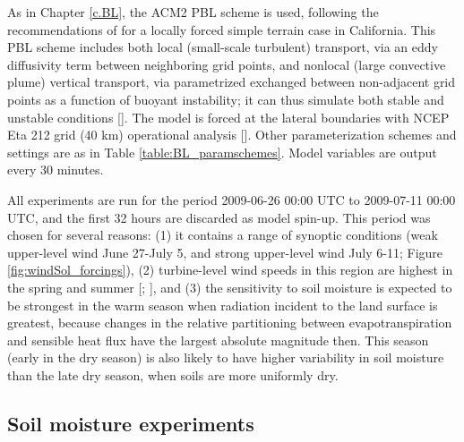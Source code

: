 As in Chapter \ref{c.BL}, the ACM2 PBL scheme is used, following the recommendations of \cite{marjanovic2014} for a locally forced simple terrain case in California.  This PBL scheme includes both local (small-scale turbulent) transport, via an eddy diffusivity term between neighboring grid points, and nonlocal (large convective plume) vertical transport, via parametrized exchanged between non-adjacent grid points as a function of buoyant instability; it can thus simulate both stable and unstable conditions [\cite{pleim2007combined}].  The model is forced at the lateral boundaries with NCEP Eta 212 grid (40 km) operational analysis [\cite{ncep}].  Other parameterization schemes and settings are as in Table \ref{table:BL_paramschemes}.  Model variables are output every 30 minutes.

All experiments are run for the period 2009-06-26 00:00 UTC to 2009-07-11 00:00 UTC, and the first 32 hours are discarded as model spin-up.  This period was chosen for several reasons: (1) it contains a range of synoptic conditions (weak upper-level wind June 27-July 5, and strong upper-level wind July 6-11; Figure \ref{fig:windSol_forcings}), (2) turbine-level wind speeds in this region are highest in the spring and summer [\cite{zhong2004diurnal}; \cite{mansbach2010synoptic}], and (3) the sensitivity to soil moisture is expected to be strongest in the warm season when radiation incident to the land surface is greatest, because changes in the relative partitioning between evapotranspiration and sensible heat flux have the largest absolute magnitude then.  This season (early in the dry season) is also likely to have higher variability in soil moisture than the late dry season, when soils are more uniformly dry.

\subsection{Soil moisture experiments}

